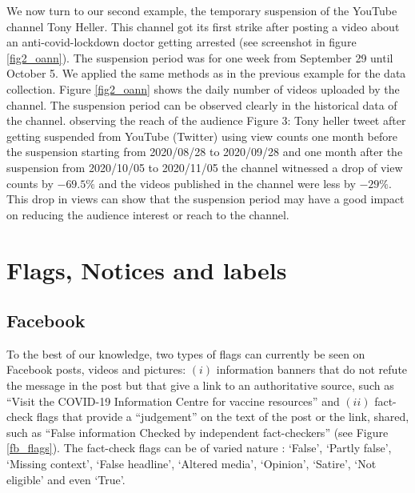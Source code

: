 \documentclass{article}
\begin{document}
We now turn to our second example, the temporary suspension of the YouTube channel Tony Heller. This channel got its first strike after posting a video about an anti-covid-lockdown doctor getting arrested (see screenshot in figure \ref{fig2_oann}). The suspension period was for one week from September 29 until October 5. We applied the same methods as in the previous example for the data collection. Figure \ref{fig2_oann} shows the daily number of videos uploaded by the channel. The suspension period can be observed clearly in the historical data of the channel.  observing the reach of the audience 
Figure 3: Tony heller tweet after getting suspended from YouTube (Twitter)
using view counts one month before the suspension starting from 2020/08/28 to 2020/09/28 and one month after the suspension from 2020/10/05 to 2020/11/05 the channel witnessed a drop of view counts by $-69.5\%$ and the videos published in the channel were less by $-29\%$. This drop in views can show that the  suspension  period
may  have  a  good  impact  on  reducing  the  audience interest or reach to the channel.


\section{Flags, Notices and labels} \label{flags}

\subsection{Facebook}

To the best of our knowledge, two types of flags can currently be seen on Facebook posts, videos and pictures: $(i)$ information banners that do not refute the message in the post but that give a link to an authoritative source, such as ``Visit the COVID-19 Information Centre for vaccine resources'' and $(ii)$ fact-check flags that provide a ``judgement'' on the text of the post or the link, shared, such as ``False information Checked by independent fact-checkers'' (see Figure \ref{fb_flags}). The fact-check flags can be of varied nature : `False', `Partly false', `Missing context', `False headline', `Altered media', `Opinion', `Satire', `Not eligible' and even `True'.
\end{document}
